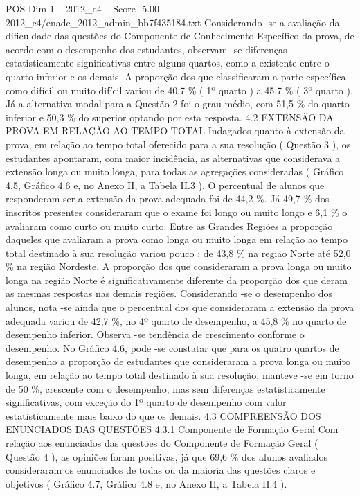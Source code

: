 \begin{textsample}{POS Dim 1 – 2012\_c4 – Score -5.00 – 2012\_c4/enade\_2012\_admin\_bb7f435184.txt}
Considerando -se a avaliação da dificuldade das questões do Componente de Conhecimento Específico da prova, de acordo com o desempenho dos estudantes, observam -se diferenças estatisticamente significativas entre alguns quartos, como a existente entre o quarto inferior e os demais.
A proporção dos que classificaram a parte específica como difícil ou muito difícil variou de 40,7 \% ( 1º quarto ) a 45,7 \% ( 3º quarto ).
Já a alternativa modal para a Questão 2 foi o grau médio, com 51,5 \% do quarto inferior e 50,3 \% do superior optando por esta resposta. 4.2 EXTENSÃO DA PROVA EM RELAÇÃO AO TEMPO TOTAL Indagados quanto à extensão da prova, em relação ao tempo total oferecido para a sua resolução ( Questão 3 ), os estudantes apontaram, com maior incidência, as alternativas que considerava a extensão longa ou muito longa, para todas as agregações consideradas ( Gráfico 4.5, Gráfico 4.6 e, no Anexo II, a Tabela II.3 ).
O percentual de alunos que responderam ser a extensão da prova adequada foi de 44,2 \%.
Já 49,7 \% dos inscritos presentes consideraram que o exame foi longo ou muito longo e 6,1 \% o avaliaram como curto ou muito curto.
Entre as Grandes Regiões a proporção daqueles que avaliaram a prova como longa ou muito longa em relação ao tempo total destinado à sua resolução variou pouco : de 43,8 \% na região Norte até 52,0 \% na região Nordeste.
A proporção dos que consideraram a prova longa ou muito longa na região Norte é significativamente diferente da proporção dos que deram as mesmas respostas nas demais regiões.
Considerando -se o desempenho dos alunos, nota -se ainda que o percentual dos que consideraram a extensão da prova adequada variou de 42,7 \%, no 4º quarto de desempenho, a 45,8 \% no quarto de desempenho inferior.
Observa -se tendência de crescimento conforme o desempenho.
No Gráfico 4.6, pode -se constatar que para os quatro quartos de desempenho a proporção de estudantes que consideraram a prova longa ou muito longa, em relação ao tempo total destinado à sua resolução, manteve -se em torno de 50 \%, crescente com o desempenho, mas sem diferenças estatisticamente significativas, com exceção do 1º quarto de desempenho com valor estatisticamente mais baixo do que os demais. 4.3 COMPREENSÃO DOS ENUNCIADOS DAS QUESTÕES 4.3.1 Componente de Formação Geral Com relação aos enunciados das questões do Componente de Formação Geral ( Questão 4 ), as opiniões foram positivas, já que 69,6 \% dos alunos avaliados consideraram os enunciados de todas ou da maioria das questões claros e objetivos ( Gráfico 4.7, Gráfico 4.8 e, no Anexo II, a Tabela II.4 ).

\end{textsample}
